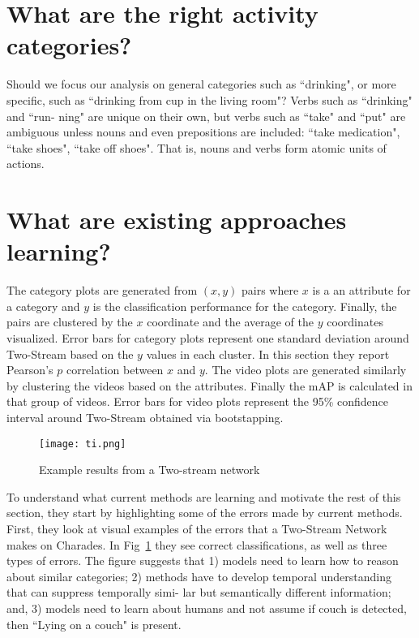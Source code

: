\documentclass[10pt,twocolumn,letterpaper]{article}
\begin{document}
\section{What are the right activity categories?}
Should we focus our analysis on general categories such as ``drinking", or more specific, such as ``drinking from cup
in the living room"? Verbs such as ``drinking" and ``run-
ning" are unique on their own, but verbs such as ``take" and
``put" are ambiguous unless nouns and even prepositions are
included: ``take medication", ``take shoes", ``take off shoes".
That is, nouns and verbs form atomic units of actions.
\section{What are existing approaches learning?}
The category plots are generated from $(x, y)$ pairs where $x$ is a an attribute for a category and $y$ is the classification performance for the category. Finally, the pairs are clustered by the $x$ coordinate and the average of the $y$ coordinates visualized. Error bars for category plots represent one standard deviation around Two-Stream based on the $y$ values in each cluster. In this section they report Pearson's $p$ correlation between $x$ and $y$. The video plots are generated similarly by clustering the videos based on the attributes. Finally the mAP is calculated in that group of videos. Error bars for video plots represent the 95\% confidence interval around Two-Stream obtained via bootstapping.
  \begin{figure}[!htb]
  	\centering
  	\texttt{[image: ti.png]}\\
  	\caption{Example results from a Two-stream network}\label{Figure2} 
  \end{figure}
\par To understand what current methods are learning and motivate the rest of this section, they start by highlighting some of the errors made by current methods. First, they look at visual examples of the errors that a Two-Stream Network makes on Charades. In Fig~\ref{Figure2} they see correct
classifications, as well as three types of errors. The figure suggests that 1) models need to learn how to reason about similar categories; 2) methods have to develop temporal understanding that can suppress temporally simi-
lar but semantically different information; and, 3) models need to learn about humans and not assume if couch is detected, then ``Lying on a couch" is present.


\end{document}
